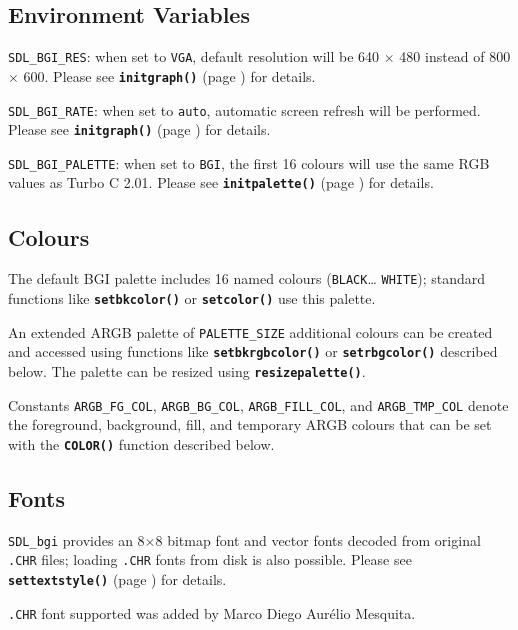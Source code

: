\documentclass[a4paper,12pt]{article}
\newcommand{\SDLbgi}{\texttt{SDL\_bgi}}
\newcommand{\func}[1]{\textbf{\texttt{#1}}}  %
\newcommand{\T}[1]{\texttt{#1}}     %
\begin{document}

\subsection{Environment Variables}

\T{SDL\_BGI\_RES}: when set to \T{VGA}, default resolution will be 640
$\times$ 480 instead of 800 $\times$ 600. Please see
\func{initgraph()} (page \pageref{sec:initgraph}) for details.

\T{SDL\_BGI\_RATE}: when set to \T{auto}, automatic screen refresh
will be performed. Please see \func{initgraph()} (page
\pageref{sec:initgraph}) for details.

\T{SDL\_BGI\_PALETTE}: when set to \T{BGI}, the first 16 colours will
use the same RGB values as Turbo C 2.01. Please see
\func{initpalette()} (page \pageref{sec:initpalette}) for details.


\subsection{Colours}

The default BGI palette includes 16 named colours (\T{BLACK}{\ldots}
\T{WHITE}); standard functions like \func{setbkco\-lor()} or
\func{setcolor()} use this palette.

An extended ARGB palette of \T{PALETTE\_SIZE} additional colours can
be created and accessed using functions like \func{setbkrgbco\-lor()}
or \func{setrbgcolor()} described below. The palette can be resized
using \func{resizepalette()}.

Constants \T{ARGB\_FG\_COL}, \T{ARGB\_BG\_COL}, \T{ARGB\_FILL\_COL},
and \T{ARGB\_TMP\_COL} denote the foreground, background, fill, and
temporary ARGB colours that can be set with the \func{COLOR()}
function described below.


\subsection{Fonts}

\SDLbgi{} provides an 8$\times$8 bitmap font and vector fonts decoded
from original \T{.CHR} files; loading \T{.CHR} fonts from disk is also
possible. Please see \func{settextstyle()} (page
\pageref{sec:settextstyle}) for details.

  \T{.CHR} font supported was added by Marco Diego Aur\'elio Mesquita.
\end{document}
